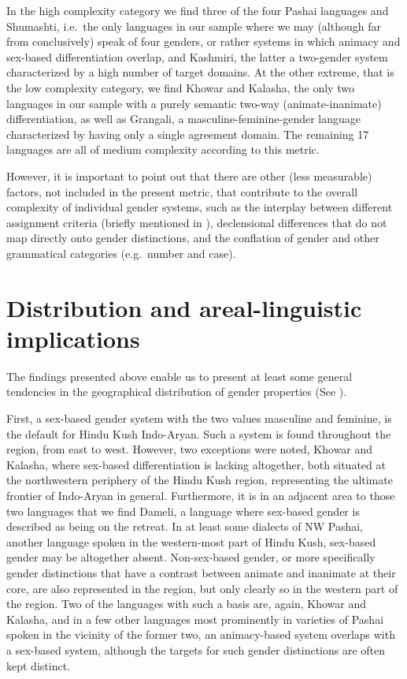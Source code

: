 \documentclass[output=collectionpaper]{langsci/langscibook}
\begin{document}
In the high complexity category we find three of the four Pashai languages and Shumashti, i.e.\ the only languages in our sample where we may (although far from conclusively) speak of four genders, or rather systems in which animacy and sex-based differentiation overlap, and Kashmiri, the latter a two-gender system characterized by a high number of target domains. At the other extreme, that is the low complexity category, we find Khowar and Kalasha, the only two languages in our sample with a purely semantic two-way (animate-inanimate) differentiation, as well as Grangali, a masculine-feminine-gender language characterized by having only a single agreement domain. The remaining 17 languages are all of medium complexity according to this metric.

However, it is important to point out that there are other (less measurable) factors, not included in the present metric, that contribute to the overall complexity of individual gender systems, such as the interplay between different assignment criteria (briefly mentioned in  ), declensional differences that do not map directly onto gender distinctions, and the conflation of gender and other grammatical categories (e.g.\ number and case).

\section{Distribution and areal-linguistic implications}

The findings presented above enable us to present at least some general tendencies in the geographical distribution of gender properties (See ).

First, a sex-based gender system with the two values masculine and feminine, is the default for Hindu Kush Indo-Aryan. Such a system is found throughout the region, from east to west. However, two exceptions were noted, Khowar and Kalasha, where sex-based differentiation is lacking altogether, both situated at the northwestern periphery of the Hindu Kush region, representing the ultimate frontier of Indo-Aryan in general. Furthermore, it is in an adjacent area to those two languages that we find Dameli, a language where sex-based gender is described as being on the retreat. In at least some dialects of NW Pashai, another language spoken in the western-most part of Hindu Kush, sex-based gender may be altogether absent. Non-sex-based gender, or more specifically gender distinctions that have a contrast between animate and inanimate at their core, are also represented in the region, but only clearly so in the western part of the region. Two of the languages with such a basis are, again, Khowar and Kalasha, and in a few other languages \textendash{} most prominently in varieties of Pashai \textendash{} spoken in the vicinity of the former two, an animacy-based system overlaps with a sex-based system, although the targets for such gender distinctions are often kept distinct.
\end{document}
